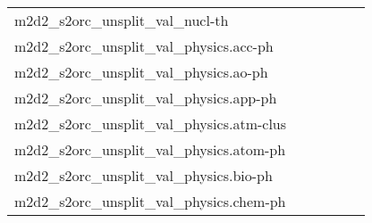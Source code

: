 {\begin{longtable}{m{6cm}m{1.7cm}m{1.7cm}m{1.7cm}m{1.7cm}m{1.7cm}}
	m2d2\_s2orc\_unsplit\_val\_nucl-th  & \colorbox[HTML]{c3e698}{\makebox[\mywidth][c]{11.65}} & \colorbox[HTML]{e1f3a9}{\makebox[\mywidth][c]{11.78}} & \colorbox[HTML]{ffffe5}{\makebox[\mywidth][c]{13.43}} & \colorbox[HTML]{cae99c}{\makebox[\mywidth][c]{11.68}} & \colorbox[HTML]{77c578}{\makebox[\mywidth][c]{11.48}}\\
	m2d2\_s2orc\_unsplit\_val\_physics.acc-ph  & \colorbox[HTML]{b3df91}{\makebox[\mywidth][c]{13.75}} & \colorbox[HTML]{e5f4ab}{\makebox[\mywidth][c]{14.01}} & \colorbox[HTML]{ffffe5}{\makebox[\mywidth][c]{16.17}} & \colorbox[HTML]{b2df90}{\makebox[\mywidth][c]{13.74}} & \colorbox[HTML]{77c578}{\makebox[\mywidth][c]{13.58}}\\
	m2d2\_s2orc\_unsplit\_val\_physics.ao-ph  & \colorbox[HTML]{cdeb9d}{\makebox[\mywidth][c]{13.92}} & \colorbox[HTML]{e3f4aa}{\makebox[\mywidth][c]{14.04}} & \colorbox[HTML]{ffffe5}{\makebox[\mywidth][c]{15.91}} & \colorbox[HTML]{c3e698}{\makebox[\mywidth][c]{13.89}} & \colorbox[HTML]{77c578}{\makebox[\mywidth][c]{13.68}}\\
	m2d2\_s2orc\_unsplit\_val\_physics.app-ph  & \colorbox[HTML]{d8efa2}{\makebox[\mywidth][c]{13.70}} & \colorbox[HTML]{e8f6ae}{\makebox[\mywidth][c]{13.81}} & \colorbox[HTML]{ffffe5}{\makebox[\mywidth][c]{15.54}} & \colorbox[HTML]{c3e698}{\makebox[\mywidth][c]{13.62}} & \colorbox[HTML]{77c578}{\makebox[\mywidth][c]{13.43}}\\
	m2d2\_s2orc\_unsplit\_val\_physics.atm-clus  & \colorbox[HTML]{ceeb9e}{\makebox[\mywidth][c]{13.00}} & \colorbox[HTML]{e4f4ab}{\makebox[\mywidth][c]{13.13}} & \colorbox[HTML]{ffffe5}{\makebox[\mywidth][c]{15.11}} & \colorbox[HTML]{cdeb9d}{\makebox[\mywidth][c]{13.00}} & \colorbox[HTML]{77c578}{\makebox[\mywidth][c]{12.74}}\\
	m2d2\_s2orc\_unsplit\_val\_physics.atom-ph  & \colorbox[HTML]{d0ec9e}{\makebox[\mywidth][c]{12.74}} & \colorbox[HTML]{e3f4aa}{\makebox[\mywidth][c]{12.84}} & \colorbox[HTML]{ffffe5}{\makebox[\mywidth][c]{14.44}} & \colorbox[HTML]{d1ec9f}{\makebox[\mywidth][c]{12.75}} & \colorbox[HTML]{77c578}{\makebox[\mywidth][c]{12.53}}\\
	m2d2\_s2orc\_unsplit\_val\_physics.bio-ph  & \colorbox[HTML]{cae99c}{\makebox[\mywidth][c]{13.30}} & \colorbox[HTML]{e2f3a9}{\makebox[\mywidth][c]{13.42}} & \colorbox[HTML]{ffffe5}{\makebox[\mywidth][c]{15.26}} & \colorbox[HTML]{ceeb9e}{\makebox[\mywidth][c]{13.32}} & \colorbox[HTML]{77c578}{\makebox[\mywidth][c]{13.08}}\\
	m2d2\_s2orc\_unsplit\_val\_physics.chem-ph  & \colorbox[HTML]{ccea9c}{\makebox[\mywidth][c]{13.20}} & \colorbox[HTML]{ddf1a6}{\makebox[\mywidth][c]{13.29}} & \colorbox[HTML]{ffffe5}{\makebox[\mywidth][c]{15.22}} & \colorbox[HTML]{bde395}{\makebox[\mywidth][c]{13.14}} & \colorbox[HTML]{77c578}{\makebox[\mywidth][c]{12.97}}\\

\end{longtable}}
